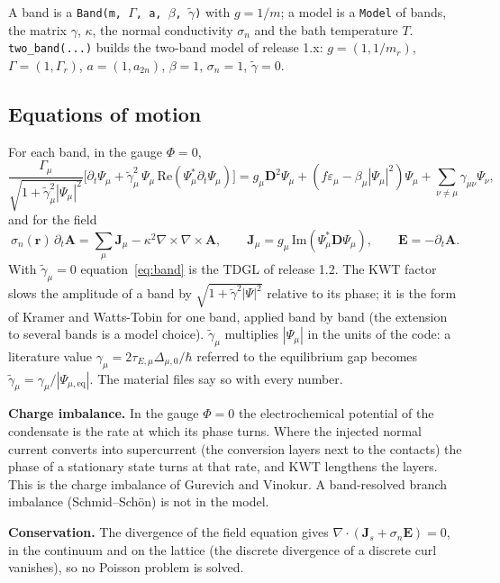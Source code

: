 \documentclass[11pt,a4paper]{article}
\newcommand{\code}[1]{\texttt{#1}}
\newcommand{\gt}{\tilde\gamma}
\begin{document}
A band is a \code{Band(m, \(\Gamma\), a, \(\beta\), \(\gt\))} with $g = 1/m$; a model is a \code{Model} of bands, the
matrix $\gamma$, $\kappa$, the normal conductivity $\sigma_n$ and the bath temperature $T$. \code{two\_band(...)} builds
the two-band model of release 1.x: $g = (1, 1/m_r)$, $\Gamma = (1, \Gamma_r)$, $a = (1, a_{2n})$, $\beta = 1$,
$\sigma_n = 1$, $\gt = 0$.

\subsection{Equations of motion}

For each band, in the gauge $\Phi = 0$,
\begin{equation}
  \frac{\Gamma_\mu}{\sqrt{1+\gt_\mu^2|\Psi_\mu|^2}}
  \Big[ \partial_t\Psi_\mu + \gt_\mu^2\,\Psi_\mu\,\mathrm{Re}(\Psi_\mu^*\partial_t\Psi_\mu) \Big]
  = g_\mu \mathbf D^2 \Psi_\mu + (f\varepsilon_\mu - \beta_\mu|\Psi_\mu|^2)\Psi_\mu + \sum_{\nu\neq\mu}\gamma_{\mu\nu}\Psi_\nu ,
  \label{eq:band}
\end{equation}
and for the field
\begin{equation}
  \sigma_n(\mathbf r)\,\partial_t\mathbf A = \sum_\mu \mathbf J_\mu - \kappa^2 \nabla\times\nabla\times\mathbf A ,
  \qquad \mathbf J_\mu = g_\mu\,\mathrm{Im}(\Psi_\mu^*\mathbf D\Psi_\mu), \qquad \mathbf E = -\partial_t\mathbf A .
\end{equation}
With $\gt_\mu = 0$ equation~\eqref{eq:band} is the TDGL of release 1.2. The KWT factor slows the amplitude of a band
by $\sqrt{1+\gt^2|\Psi|^2}$ relative to its phase; it is the form of Kramer and Watts-Tobin for one band, applied band
by band (the extension to several bands is a model choice). $\gt_\mu$ multiplies $|\Psi_\mu|$ in the units of the code:
a literature value $\gamma_\mu = 2\tau_{E,\mu}\Delta_{\mu,0}/\hbar$ referred to the equilibrium gap becomes
$\gt_\mu = \gamma_\mu/|\Psi_{\mu,\mathrm{eq}}|$. The material files say so with every number.

\textbf{Charge imbalance.} In the gauge $\Phi = 0$ the electrochemical potential of the condensate is the rate at
which its phase turns. Where the injected normal current converts into supercurrent (the conversion layers next to the
contacts) the phase of a stationary state turns at that rate, and KWT lengthens the layers. This is the charge
imbalance of Gurevich and Vinokur. A band-resolved branch imbalance (Schmid--Sch\"on) is not in the model.

\textbf{Conservation.} The divergence of the field equation gives $\nabla\cdot(\mathbf J_s + \sigma_n\mathbf E) = 0$,
in the continuum and on the lattice (the discrete divergence of a discrete curl vanishes), so no Poisson problem is
solved.
\end{document}

